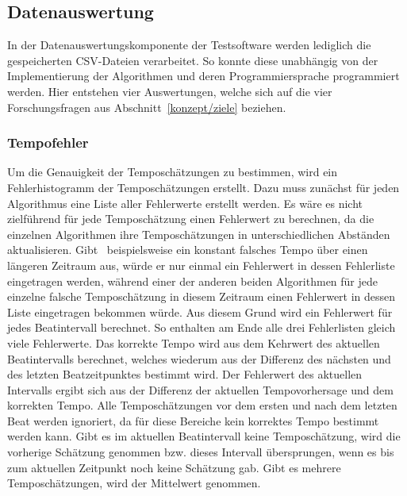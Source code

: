 {	\subsection{Datenauswertung}
	{
		In der Datenauswertungskomponente der Testsoftware werden lediglich die gespeicherten \acs{CSV}-Dateien verarbeitet.
		So konnte diese unabhängig von der Implementierung der Algorithmen und deren Programmiersprache programmiert werden.
		Hier entstehen vier Auswertungen,
			welche sich auf die vier Forschungsfragen aus Abschnitt~\ref{konzept/ziele} beziehen.

		\subsubsection*{Tempofehler}
		{
			Um die Genauigkeit der Temposchätzungen zu bestimmen,
				wird ein Fehlerhistogramm der Temposchätzungen erstellt.
			Dazu muss zunächst für jeden Algorithmus eine Liste aller Fehlerwerte erstellt werden.
			Es wäre es nicht zielführend für jede Temposchätzung einen Fehlerwert zu berechnen,
				da die einzelnen Algorithmen ihre Temposchätzungen in unterschiedlichen Abständen aktualisieren.
			Gibt~\cite{2011_PlRoSt} beispielsweise ein konstant falsches Tempo über einen längeren Zeitraum aus,
				würde er nur einmal ein Fehlerwert in dessen Fehlerliste eingetragen werden,
				während einer der anderen beiden Algorithmen
				für jede einzelne falsche Temposchätzung in diesem Zeitraum
				einen Fehlerwert in dessen Liste eingetragen bekommen würde.
			Aus diesem Grund wird ein Fehlerwert für jedes Beatintervall berechnet.
			So enthalten am Ende alle drei Fehlerlisten gleich viele Fehlerwerte.
			Das korrekte Tempo wird aus dem Kehrwert des aktuellen Beatintervalls berechnet,
				welches wiederum aus der Differenz des nächsten und des letzten Beatzeitpunktes bestimmt wird.
			Der Fehlerwert des aktuellen Intervalls ergibt sich aus der Differenz der aktuellen Tempovorhersage und dem korrekten Tempo.
			Alle Temposchätzungen vor dem ersten und nach dem letzten Beat werden ignoriert,
				da für diese Bereiche kein korrektes Tempo bestimmt werden kann.
			Gibt es im aktuellen Beatintervall keine Temposchätzung,
				wird die vorherige Schätzung genommen
				bzw. dieses Intervall übersprungen,
				wenn es bis zum aktuellen Zeitpunkt noch keine Schätzung gab.
			Gibt es mehrere Temposchätzungen,
				wird der Mittelwert genommen.

}}}
